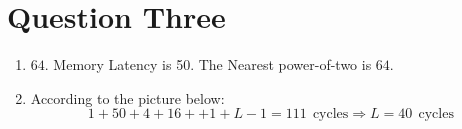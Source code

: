\documentclass[12pt]{article}
\begin{document}
\section{Question Three}


\begin{enumerate}[label=\alph*.]
	
	\item 
	
	$64$. Memory Latency is 50. The Nearest power-of-two is $64$.
	
	
	\item 
		
		According to the picture below: 
	$$1 + 50 + 4 + 16 + + 1+ L-1 = 111 ~~\text{cycles} \Rightarrow L = 40 ~~\text{cycles}$$
	
	
	
	\begin{tikzpicture}[x=0.75pt,y=0.75pt,yscale=-1,xscale=1]
		

\end{tikzpicture}
\end{enumerate}
\end{document}
